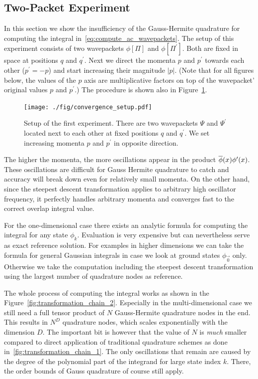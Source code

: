 \documentclass[a4paper,10pt]{article}
\begin{document}
\subsection{Two-Packet Experiment}


In this section we show the insufficiency of the Gauss-Hermite quadrature
for computing the integral in~\eqref{eq:compute_ac_wavepackets}. The setup
of this experiment consists of two wavepackets $\phi[\Pi]$ and $\phi[\Pi^\prime]$.
Both are fixed in space at positions $q$ and $q^\prime$. Next we direct the
momenta $p$ and $p^\prime$ towards each other ($p^\prime = -p$) and start
increasing their magnitude $|p|$. (Note that for all figures below, the values
of the $p$ axis are multiplicative factors on top of the wavepacket' original
values $p$ and $p^\prime$.)
The procedure is shown also in Figure~\ref{fig:convergence_setup}.

\begin{figure}[h!]
  \centering
  \texttt{[image: ./fig/convergence\_setup.pdf]}
  \caption{Setup of the first experiment. There are two wavepackets $\Psi$
    and $\Psi^\prime$ located next to each other at fixed positions $q$ and
    $q^\prime$. We set increasing momenta $p$ and $p^\prime$
    in opposite direction.}
  \label{fig:convergence_setup}
\end{figure}

The higher the momenta, the more oscillations appear in the product $\overline{\phi}(x) \phi^\prime(x)$.
These oscillations are difficult for Gauss Hermite quadrature to catch and accuracy
will break down even for relatively small momenta. On the other hand, since the
steepest descent transformation applies to arbitrary high oscillator frequency,
it perfectly handles arbitrary momenta and converges fast to the correct
overlap integral value.

For the one-dimensional case there exists an analytic formula for computing
the integral for any state $\phi_k$. Evaluation is very expensive but can nevertheless
serve as exact reference solution. For examples in higher dimensions we can take
the formula for general Gaussian integrals in case we look at ground states
$\phi_{\vec{0}}$ only. Otherwise we take the computation including the steepest
descent transformation using the largest number of quadrature nodes as reference.

The whole process of computing the integral works as shown in the
Figure~\ref{fig:transformation_chain_2}. Especially in the multi-dimensional case
we still need a full tensor product of $N$ Gauss-Hermite quadrature nodes in the end.
This results in $N^D$ quadrature nodes, which scales exponentially with the
dimension $D$. The important bit is however that the value of $N$ is \emph{much}
smaller compared to direct application of traditional quadrature schemes as done
in~\ref{fig:transformation_chain_1}.
The only oscillations that remain are caused by the degree of the polynomial part
of the integrand for large state index $k$. There, the order bounds of Gauss
quadrature of course still apply.
\end{document}

